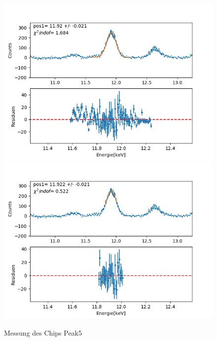 \documentclass[12pt,a4paper]{article}
\begin{document}
\begin{figure}[H]
\centering
\includegraphics[scale=0.49]{Bilder/roentgen_spektren/chip/chip5_1.png}
\includegraphics[scale=0.49]{Bilder/roentgen_spektren/chip/chip5_2.png}
\caption{Messung des Chips Peak5}
\end{figure}
\end{document}
